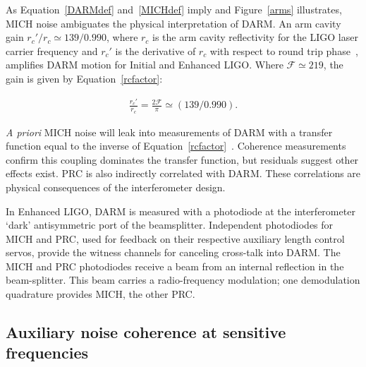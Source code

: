        As Equation~\ref{DARMdef} and~\ref{MICHdef} imply and Figure~\ref{arms} illustrates, MICH noise ambiguates the physical interpretation of DARM. An arm cavity gain $r_{c}'/r_c \simeq 139/0.990$, where $r_c$ is the arm cavity reflectivity for the LIGO laser carrier frequency and $r_{c}'$ is the derivative of $r_c$ with respect to round trip phase~\cite{ReadoutGWA,BallmerThesis}, amplifies DARM motion for Initial and Enhanced LIGO. Where $\mathcal{F} \simeq 219$, the gain is given by Equation~\ref{rcfactor}:

        \begin{eqnarray}
        \frac{r_{c}'}{r_c} = \frac{2 \mathcal{F}}{\pi} \simeq (139/0.990). \label{rcfactor}
        \end{eqnarray}

        \textit{A priori} MICH noise will leak into measurements of DARM with a transfer function equal to the inverse of Equation~\ref{rcfactor}~\cite{SiggFreq1997}. Coherence measurements confirm this coupling dominates the transfer function, but residuals suggest other effects exist. PRC is also indirectly correlated with DARM. These correlations are physical consequences of the interferometer design. 

In Enhanced LIGO, DARM is measured with a photodiode at the interferometer `dark' antisymmetric port of the beamsplitter. Independent photodiodes for MICH and PRC, used for feedback on their respective auxiliary length control servos, provide the witness channels for canceling cross-talk into DARM. The MICH and PRC photodiodes receive a beam from an internal reflection in the beam-splitter. This beam carries a radio-frequency modulation; one demodulation quadrature provides MICH, the other PRC.

        \subsection{Auxiliary noise coherence at sensitive frequencies}
        \label{aux_noise}

